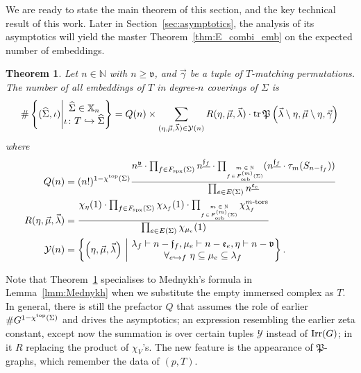 \documentclass{amsart}
\newtheorem{theorem}[conjecture]{Theorem}
\newcommand{\cht}{\chi^{\textnormal{top}}}
\newcommand{\covers}{\mathbb{X}_n}
\newcommand{\Fspx}{F_{\textnormal{spx}}}
\newcommand{\Forb}[1][m]{F^{(#1)}_{\textnormal{orb}}}
\newcommand{\iterorb}{{\tiny\begin{matrix}m\in\mathbb{N}\\f\!\in\!\Forb(\Sigma)\end{matrix}}}
\newcommand{\tn}{\textnormal}
\newcommand{\tr}{\operatorname{tr}}
\newcommand{\whS}{{\widehat{\Sigma}}}
\begin{document}
We are ready to state the main theorem of this section, and the key technical result of this work. Later in Section~\ref{sec:asymptotics}, the analysis of its asymptotics will yield the master Theorem~\ref{thm:E_combi_emb} on the expected number of embeddings.
\begin{theorem}\label{thm:count_tangles}
Let $n\in\mathbb{N}$ with $n\geqslant\mathfrak{v}$, and $\vec\gamma$ be a tuple of $T$-matching permutations. The number of all embeddings of $T$ in degree-$n$ coverings of $\Sigma$ is
\begin{equation*}
\#\left\{(\whS,\iota)\Bigg|\begin{matrix}\whS\in\covers\\\iota\colon T\hookrightarrow\whS\end{matrix}\right\}=Q(n)\times\sum_{(\eta,\vec\mu,\vec\lambda)\in\mathcal{Y}(n)}R(\eta,\vec\mu,\vec\lambda)\cdot\tr\mathfrak{P}\left(\vec\lambda\setminus\eta,\vec\mu\setminus\eta,\vec\gamma\right)\\
\end{equation*}
where
\begin{align*}
Q(n)&=(n!)^{1-\cht(\Sigma)}\frac{n^{\underline{\mathfrak{v}}}\cdot\prod_{f\in\Fspx(\Sigma)}n^{\underline{\mathfrak{f}_f}}\cdot\prod_\iterorb(n^{\underline{\mathfrak{f}_f}}\cdot\tau_m(S_{n-\mathfrak{f}_f}))}{\prod_{e\in E(\Sigma)}n^{\underline{\mathfrak{e}_e}}}\\
R(\eta,\vec\mu,\vec\lambda)&=\frac{\chi_\eta(1)\cdot\prod_{f\in\Fspx(\Sigma)}\chi_{\lambda_f}(1)\cdot\prod_\iterorb\chi_{\lambda_f}^{m\tn{-tors}}}{\prod_{e\in E(\Sigma)}\chi_{\mu_e}(1)}\\
\mathcal{Y}(n)&=\left\{\left(\eta,\vec\mu,\vec\lambda\right)\ \middle|\ \begin{matrix}\lambda_f\vdash n-\mathfrak{f}_f,\mu_e\vdash n-\mathfrak{e}_e,\eta\vdash n-\mathfrak{v}\\\forall_{e\hookrightarrow f}\ \eta\subseteq\mu_e\subseteq\lambda_f\end{matrix}\right\}.
\end{align*}
\end{theorem}
Note that Theorem~\ref{thm:count_tangles} specialises to Mednykh's formula in Lemma~\ref{lmm:Mednykh} when we substitute the empty immersed complex as $T$. In general, there is still the prefactor $Q$ that assumes the role of earlier $\#G^{1-\chi^\tn{top}(\Sigma)}$ and drives the asymptotics; an expression resembling the earlier zeta constant, except now the summation is over certain tuples $\mathcal{Y}$ instead of $\tn{Irr}(G)$; in it $R$ replacing the product of $\chi_V$'s. The new feature is the appearance of $\mathfrak{P}$-graphs, which remember the data of $(p,T)$.
\end{document}
